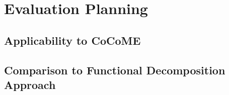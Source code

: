 \chapter{Evaluation Planning}
\label{ch:EvalutationPlanning}

\section{Applicability to CoCoME}
\label{sec:EvaluationPlanning:ApplicabilityToCoCoME}

\section{Comparison to Functional Decomposition Approach}